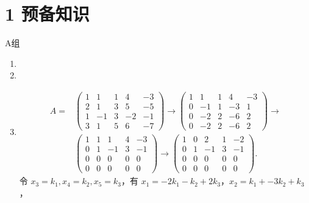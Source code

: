\section*{1 预备知识}

\vspace{2ex}

\centerline{\heiti A组}
\begin{enumerate}
    \item
    \item
    \item
        \begin{align*}
            A=&
            \begin{pmatrix}
                1 & 1  & 1 & 4  & -3 \\
                2 & 1  & 3 & 5  & -5 \\
                1 & -1 & 3 & -2 & -1 \\
                3 & 1  & 5 & 6  & -7
            \end{pmatrix}
            \rightarrow
            \begin{pmatrix}
                1 & 1  & 1 & 4  & -3 \\
                0 & -1 & 1 & -3 & 1  \\
                0 & -2 & 2 & -6 & 2  \\
                0 & -2 & 2 & -6 & 2
            \end{pmatrix}
            \rightarrow \\
             &
            \begin{pmatrix}
                1 & 1 & 1  & 4 & -3 \\
                0 & 1 & -1 & 3 & -1 \\
                0 & 0 & 0  & 0 & 0  \\
                0 & 0 & 0  & 0 & 0
            \end{pmatrix}
            \rightarrow
            \begin{pmatrix}
                1 & 0 & 2  & 1 & -2 \\
                0 & 1 & -1 & 3 & -1 \\
                0 & 0 & 0  & 0 & 0  \\
                0 & 0 & 0  & 0 & 0
            \end{pmatrix}.
        \end{align*}
        令 $ x_3 = k_1, x_4 = k_2, x_5 = k_3$，有 $x_1 = -2k_1 - k_2 + 2k_3$，$x_2 = k_1 + -3k_2 + k_3 $ ，

\end{enumerate}
